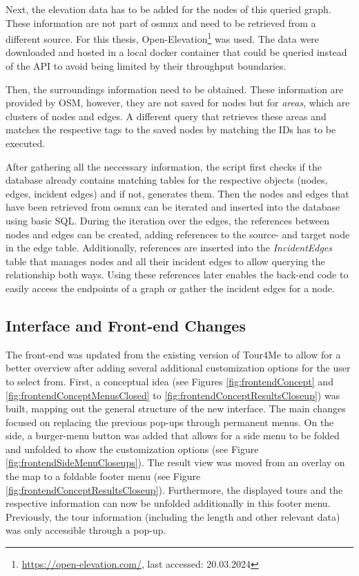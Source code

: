 Next, the elevation data has to be added for the nodes of this queried graph.
These information are not part of osmnx and need to be retrieved from a different source.
For this thesis, Open-Elevation\footnote{\url{https://open-elevation.com/}, last accessed: 20.03.2024} was used.
The data were downloaded and hosted in a local docker container that could be queried instead of the API to avoid being limited by their throughput boundaries.

Then, the surroundings information need to be obtained. 
These information are provided by OSM, however, they are not saved for nodes but for \textit{areas}, which are clusters of nodes and edges.
A different query that retrieves these areas and matches the respective tags to the saved nodes by matching the IDs has to be executed.

After gathering all the neccessary information, the script first checks if the database already contains matching tables for the respective objects (nodes, edges, incident edges) and if not, generates them.
Then the nodes and edges that have been retrieved from osmnx can be iterated and inserted into the database using basic SQL.
During the iteration over the edges, the references between nodes and edges can be created, adding references to the source- and target node in the edge table.
Additionally, references are inserted into the \textit{IncidentEdges} table that manages nodes and all their incident edges to allow querying the relationship both ways.
Using these references later enables the back-end code to easily access the endpoints of a graph or gather the incident edges for a node. 



\subsection{Interface and Front-end Changes}
\label{subsec:interfaceAndFrontendChanges}

The front-end was updated from the existing version of Tour4Me to allow for a better overview after adding several additional customization options for the user to select from. 
First, a conceptual idea (see Figures \ref{fig:frontendConcept} and \ref{fig:frontendConceptMenusClosed} to \ref{fig:frontendConceptResultsCloseup}) was built, mapping out the general structure of the new interface. 
The main changes focused on replacing the previous pop-ups through permanent menus.
On the side, a burger-menu button was added that allows for a side menu to be folded and unfolded to show the customization options (see Figure \ref{fig:frontendSideMenuCloseups}). 
The result view was moved from an overlay on the map to a foldable footer menu (see Figure \ref{fig:frontendConceptResultsCloseup}). 
Furthermore, the displayed tours and the respective information can now be unfolded additionally in this footer menu.
Previously, the tour information (including the length and other relevant data) was only accessible through a pop-up. 

